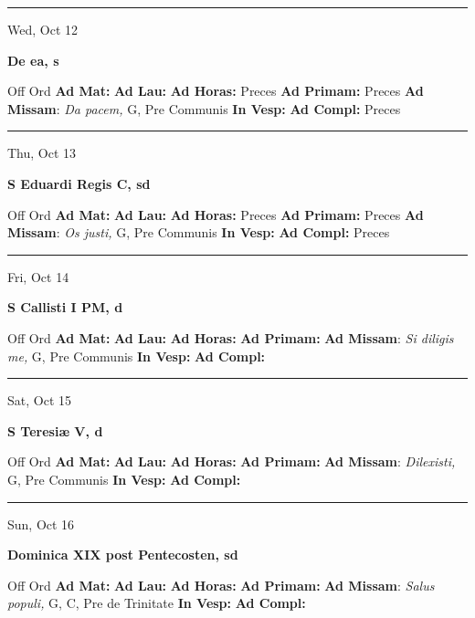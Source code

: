 \documentclass[letterpaper, 10pt]{article}
\begin{document}
\hrule
\begin{center}
Wed, Oct 12
\end{center}\textbf{ \large De ea, \textnormal{\normalsize s}}
\begin{justify}
Off Ord
\textbf{Ad Mat: }
\textbf{Ad Lau: }
\textbf{Ad Horas: }Preces
\textbf{Ad Primam: }Preces
\textbf{Ad Missam}: \textit{Da pacem,} G, Pre Communis
\textbf{In Vesp: }
\textbf{Ad Compl: }Preces\end{justify}



\hrule
\begin{center}
Thu, Oct 13
\end{center}\textbf{ \large S Eduardi Regis C, \textnormal{\normalsize sd}}
\begin{justify}
Off Ord
\textbf{Ad Mat: }
\textbf{Ad Lau: }
\textbf{Ad Horas: }Preces
\textbf{Ad Primam: }Preces
\textbf{Ad Missam}: \textit{Os justi,} G, Pre Communis
\textbf{In Vesp: }
\textbf{Ad Compl: }Preces\end{justify}



\hrule
\begin{center}
Fri, Oct 14
\end{center}\textbf{ \large S Callisti I PM, \textnormal{\normalsize d}}
\begin{justify}
Off Ord
\textbf{Ad Mat: }
\textbf{Ad Lau: }
\textbf{Ad Horas: }
\textbf{Ad Primam: }
\textbf{Ad Missam}: \textit{Si diligis me,} G, Pre Communis
\textbf{In Vesp: }
\textbf{Ad Compl: }\end{justify}



\hrule
\begin{center}
Sat, Oct 15
\end{center}\textbf{ \large S Teresiæ V, \textnormal{\normalsize d}}
\begin{justify}
Off Ord
\textbf{Ad Mat: }
\textbf{Ad Lau: }
\textbf{Ad Horas: }
\textbf{Ad Primam: }
\textbf{Ad Missam}: \textit{Dilexisti,} G, Pre Communis
\textbf{In Vesp: }
\textbf{Ad Compl: }\end{justify}



\hrule
\begin{center}
Sun, Oct 16
\end{center}\textbf{ \large Dominica XIX post Pentecosten, \textnormal{\normalsize sd}}
\begin{justify}
Off Ord
\textbf{Ad Mat: }
\textbf{Ad Lau: }
\textbf{Ad Horas: }
\textbf{Ad Primam: }
\textbf{Ad Missam}: \textit{Salus populi,} G, C, Pre de Trinitate
\textbf{In Vesp: }
\textbf{Ad Compl: }\end{justify}
\end{document}
